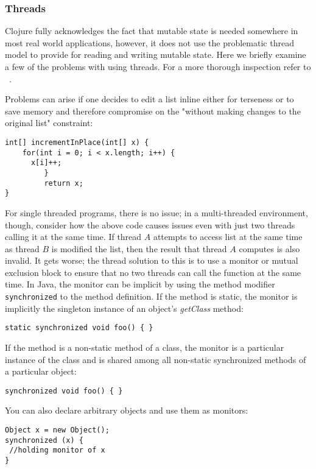 \subsubsection{Threads}
Clojure fully acknowledges the fact that mutable state is needed
somewhere in most real world applications, however, it does not use
the problematic thread model to provide for reading and writing
mutable state. 
Here we briefly examine a few of the problems with using threads. 
For a more thorough inspection refer to ~\cite{1076522}.

Problems can arise if one decides to edit a list inline either for terseness or to save memory and therefore compromise on the 
"without making changes to the original list" constraint: 

\lstset{language=Java}
\begin{lstlisting}
int[] incrementInPlace(int[] x) {
	for(int i = 0; i < x.length; i++) { 
	  x[i]++;
         }
         return x;
}
\end{lstlisting}

For single threaded programs, there is no issue; in a multi-threaded environment, though, consider how the above code
causes issues even with just two threads calling it at the same time. 
If thread $A$ attempts to access list at the same time as thread $B$ is modified the list, then the result
that thread $A$ computes is also invalid. 
It gets worse; the thread solution to this is to use a monitor or mutual exclusion block to
ensure that no two threads can call the function at the same time. 
In Java, the monitor can be implicit by using the method modifier {\tt synchronized} to the method definition. 
If the method is static, the monitor is implicitly the singleton instance of an object's {\it getClass} method:

\lstset{language=Java}
\begin{lstlisting}
static synchronized void foo() { }
\end{lstlisting}

If the method is a non-static method of a class, the monitor is a 
particular instance of the class and is shared among all non-static synchronized methods of a particular object:

\lstset{language=Java}
\begin{lstlisting}
synchronized void foo() { }
\end{lstlisting}

You can also declare arbitrary objects and use them as monitors:

\lstset{language=Java}
\begin{lstlisting}
Object x = new Object();
synchronized (x) {
 //holding monitor of x
}
\end{lstlisting}


